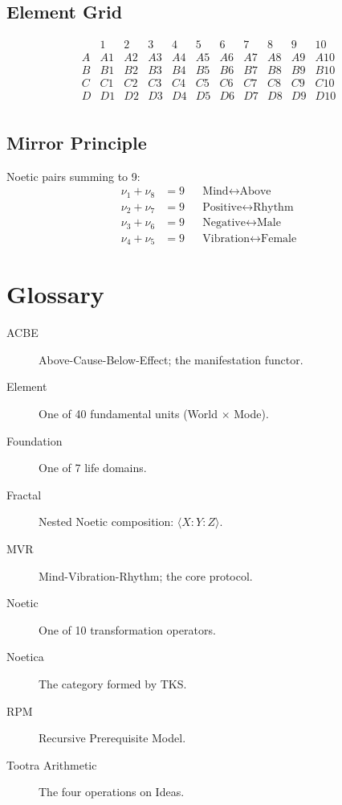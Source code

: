 \documentclass[11pt,twoside,openright]{book}
\theoremstyle{definition}
\theoremstyle{plain}
\theoremstyle{remark}
\newcommand{\noe}[1]{\nu_{#1}}
\begin{document}
\section{Element Grid}

\[
\begin{array}{c|cccccccccc}
 & 1 & 2 & 3 & 4 & 5 & 6 & 7 & 8 & 9 & 10 \\
\hline
A & A1 & A2 & A3 & A4 & A5 & A6 & A7 & A8 & A9 & A10 \\
B & B1 & B2 & B3 & B4 & B5 & B6 & B7 & B8 & B9 & B10 \\
C & C1 & C2 & C3 & C4 & C5 & C6 & C7 & C8 & C9 & C10 \\
D & D1 & D2 & D3 & D4 & D5 & D6 & D7 & D8 & D9 & D10 \\
\end{array}
\]

\section{Mirror Principle}

Noetic pairs summing to 9:
\begin{align*}
\noe{1} + \noe{8} &= 9 && \text{Mind} \leftrightarrow \text{Above} \\
\noe{2} + \noe{7} &= 9 && \text{Positive} \leftrightarrow \text{Rhythm} \\
\noe{3} + \noe{6} &= 9 && \text{Negative} \leftrightarrow \text{Male} \\
\noe{4} + \noe{5} &= 9 && \text{Vibration} \leftrightarrow \text{Female}
\end{align*}

\chapter{Glossary}
\label{app:glossary}

\begin{description}
\item[ACBE] Above-Cause-Below-Effect; the manifestation functor.
\item[Element] One of 40 fundamental units (World $\times$ Mode).
\item[Foundation] One of 7 life domains.
\item[Fractal] Nested Noetic composition: $\langle X : Y : Z \rangle$.
\item[MVR] Mind-Vibration-Rhythm; the core protocol.
\item[Noetic] One of 10 transformation operators.
\item[Noetica] The category formed by TKS.
\item[RPM] Recursive Prerequisite Model.
\item[Tootra Arithmetic] The four operations on Ideas.
\end{description}
\end{document}
